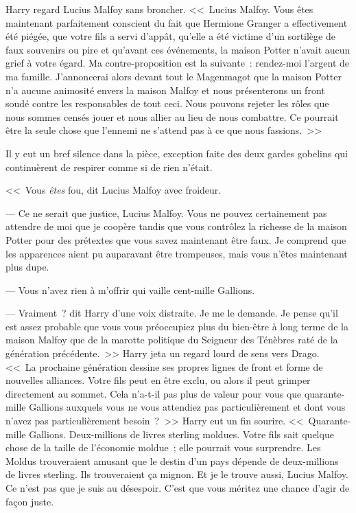 Harry regard Lucius Malfoy sans broncher. <<~Lucius Malfoy. Vous êtes maintenant parfaitement conscient du fait que Hermione Granger a effectivement été piégée, que votre fils a servi d'appât, qu'elle a été victime d'un sortilège de faux souvenirs ou pire et qu'avant ces événements, la maison Potter n'avait aucun grief à votre égard. Ma contre-proposition est la suivante~: rendez-moi l'argent de ma famille. J'annoncerai alors devant tout le Magenmagot que la maison Potter n'a aucune animosité envers la maison Malfoy et nous présenterons un front soudé contre les responsables de tout ceci. Nous pouvons rejeter les rôles que nous sommes censés jouer et nous allier au lieu de nous combattre. Ce pourrait être la seule chose que l'ennemi ne s'attend pas à ce que nous fassions.~>>

Il y eut un bref silence dans la pièce, exception faite des deux gardes gobelins qui continuèrent de respirer comme si de rien n'était.

<<~Vous \emph{êtes} fou, dit Lucius Malfoy avec froideur.

--- Ce ne serait que justice, Lucius Malfoy. Vous ne pouvez certainement pas attendre de moi que je coopère tandis que vous contrôlez la richesse de la maison Potter pour des prétextes que vous savez maintenant être faux. Je comprend que les apparences aient pu auparavant être trompeuses, mais vous n'êtes maintenant plus dupe.

--- Vous n'avez rien à m'offrir qui vaille cent-mille Gallions.

--- Vraiment~? dit Harry d'une voix distraite. Je me le demande. Je pense qu'il est assez probable que vous vous préoccupiez plus du bien-être à long terme de la maison Malfoy que de la marotte politique du Seigneur des Ténèbres raté de la génération précédente.~>> Harry jeta un regard lourd de sens vers Drago. <<~La prochaine génération dessine ses propres lignes de front et forme de nouvelles alliances. Votre fils peut en être exclu, ou alors il peut grimper directement au sommet. Cela n'a-t-il pas plus de valeur pour vous que quarante-mille Gallions auxquels vous ne vous attendiez pas particulièrement et dont vous n'avez pas particulièrement besoin~?~>> Harry eut un fin sourire. <<~Quarante-mille Gallions. Deux-millions de livres sterling moldues. Votre fils sait quelque chose de la taille de l'économie moldue~; elle pourrait vous surprendre. Les Moldus trouveraient amusant que le destin d'un pays dépende de deux-millions de livres sterling. Ils trouveraient ça mignon. Et je le trouve aussi, Lucius Malfoy. Ce n'est pas que je suis au désespoir. C'est que vous méritez une chance d'agir de façon juste.

